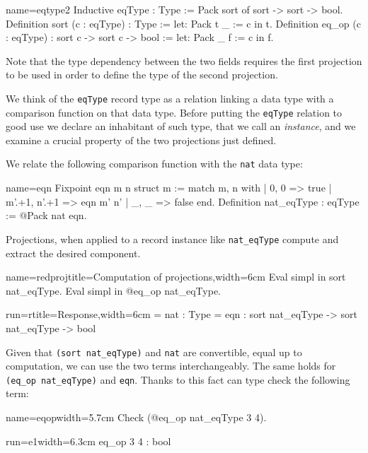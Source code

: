 \begin{coq}{name=eqtype2}{}
Inductive eqType : Type :=
  Pack sort of sort -> sort -> bool.
Definition sort (c : eqType) : Type :=
  let: Pack t _ := c in t.
Definition eq_op (c : eqType) : sort c -> sort c -> bool :=
  let: Pack _ f := c in f.
\end{coq}

Note that the type dependency between the two fields requires the first
projection to be used in order to define the type of the second projection.

We think of the \lstinline/eqType/ record type as a relation linking a
data type with a comparison function on that data type.  Before
putting the \lstinline/eqType/ relation to good use we declare an
inhabitant of such type, that we call an \emph{instance}, and we
examine a crucial property of the two projections just defined.

We relate the following comparison function with the \lstinline/nat/
data type: 

\begin{coq}{name=eqn}{}
 Fixpoint eqn m n {struct m} :=
  match m, n with
  | 0, 0 => true
  | m'.+1, n'.+1 => eqn m' n'
  | _, _ => false
  end.
Definition nat_eqType : eqType := @Pack nat eqn.
\end{coq}

Projections, when applied to a record instance like
\lstinline/nat_eqType/ compute and extract the desired component.

\begin{coq}{name=redproj}{title=Computation of projections,width=6cm}
Eval simpl in sort nat_eqType.
Eval simpl in @eq_op nat_eqType.
\end{coq}
\begin{coqout}{run=r}{title=Response,width=6cm}
= nat : Type
= eqn : sort nat_eqType ->
         sort nat_eqType -> bool
\end{coqout}

Given that \lstinline/(sort nat_eqType)/ and \lstinline/nat/
are convertible, equal up to computation, we can use the two terms
interchangeably.  The same holds for \lstinline/(eq_op nat_eqType)/
and \lstinline/eqn/.  Thanks to this fact \Coq{} can type check the
following term:

\begin{coq}{name=eqop}{width=5.7cm}
Check (@eq_op nat_eqType 3 4).
\end{coq}
\begin{coqout}{run=e1}{width=6.3cm}
eq_op 3 4 : bool
\end{coqout}

